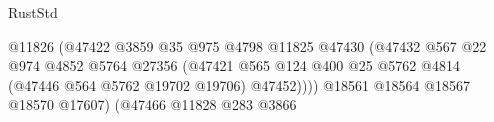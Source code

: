 \begin{lexlean}{RustStd}
\begin{coremodule}
                                                              @11826
                                                              (@47422
                                                                @3859
                                                                @35
                                                                @975
                                                                @4798
                                                                @11825
                                                                @47430
                                                                (@47432
                                                                  @567
                                                                  @22
                                                                  @974
                                                                  @4852
                                                                  @5764
                                                                  @27356
                                                                  (@47421
                                                                    @565
                                                                    @124
                                                                    @400
                                                                    @25
                                                                    @5762
                                                                    @4814
                                                                    (@47446
                                                                      @564
                                                                      @5762
                                                                      @19702
                                                                      @19706)
                                                                    @47452))))
                                                            @18561
                                                            @18564
                                                            @18567
                                                            @18570
                                                            @17607)
                                                          (@47466
                                                            @11828
                                                            @283
                                                            @3866

\end{coremodule}
\end{lexlean}
